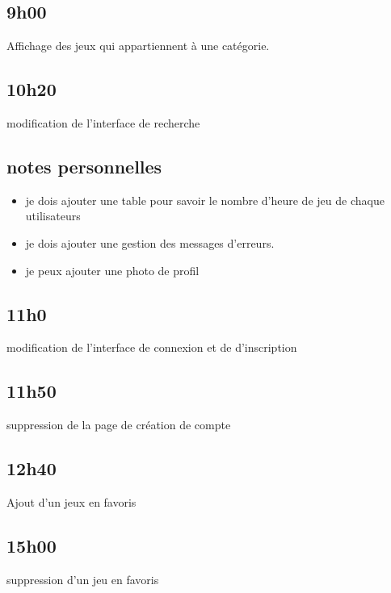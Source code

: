 \documentclass[a4paper,12pt,french]{sphinxmanual}
\begin{document}
\subsection{9h00}
\label{\detokenize{logbook:id15}}
\sphinxAtStartPar
Affichage des jeux qui appartiennent à une catégorie.


\subsection{10h20}
\label{\detokenize{logbook:id16}}
\sphinxAtStartPar
modification de l’interface de recherche


\subsection{notes personnelles}
\label{\detokenize{logbook:notes-personnelles}}\begin{itemize}
\item {} 
\sphinxAtStartPar
je dois ajouter une table pour savoir le nombre d’heure de jeu de chaque utilisateurs

\item {} 
\sphinxAtStartPar
je dois ajouter une gestion des messages d’erreurs.

\item {} 
\sphinxAtStartPar
je peux ajouter une photo de profil

\end{itemize}


\subsection{11h0}
\label{\detokenize{logbook:h0}}
\sphinxAtStartPar
modification de l’interface de connexion et de d’inscription


\subsection{11h50}
\label{\detokenize{logbook:h50}}
\sphinxAtStartPar
suppression de la page de création de compte


\subsection{12h40}
\label{\detokenize{logbook:id17}}
\sphinxAtStartPar
Ajout d’un jeux en favoris


\subsection{15h00}
\label{\detokenize{logbook:id18}}
\sphinxAtStartPar
suppression d’un jeu en favoris
\end{document}
